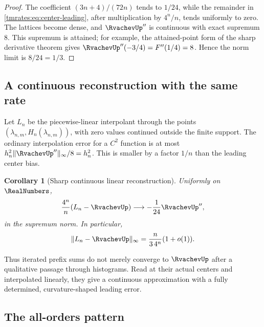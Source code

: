 \documentclass[11pt,oneside]{article}
\newtheorem{corollary}[corollary]{Corollary}
\theoremstyle{definition}
\theoremstyle{remark}
\begin{document}
\begin{proof}
The coefficient $(3n+4)/(72n)$ tends to $1/24$, while the remainder in
\eqref{tmrates:eq:center-leading}, after multiplication by $4^n/n$, tends uniformly to zero.  The
lattices become dense, and $\RvachevUp''$ is continuous with exact supremum $8$.  This supremum
is attained; for example, the attained-point form of the sharp derivative theorem gives
$\RvachevUp''(-3/4)=F''(1/4)=8$.  Hence the norm limit is $8/24=1/3$.
\end{proof}

\subsection{A continuous reconstruction with the same rate}

Let $L_n$ be the piecewise-linear interpolant through the points
$(\lambda_{n,m},H_n(\lambda_{n,m}))$, with zero values continued outside the finite support.
The ordinary interpolation error for a $C^2$ function is at most
$h_n^2\|\RvachevUp''\|_\infty/8=h_n^2$.  This is smaller by a factor $1/n$ than the leading
center bias.

\begin{corollary}[Sharp continuous linear reconstruction]
\label{tmrates:cor:linear-rate}
Uniformly on $\RealNumbers$,
\begin{equation}
 \frac{4^n}{n}(L_n-\RvachevUp)\longrightarrow-\frac1{24}\RvachevUp'',   \label{tmrates:eq:linear-profile}
\end{equation}
in the supremum norm.  In particular,
\begin{equation}
 \|L_n-\RvachevUp\|_\infty=\frac n{3\,4^n}(1+o(1)).              \label{tmrates:eq:linear-sharp}
\end{equation}
\end{corollary}

Thus iterated prefix sums do not merely converge to $\RvachevUp$ after a qualitative passage through
histograms.  Read at their actual centers and interpolated linearly, they give a continuous
approximation with a fully determined, curvature-shaped leading error.

\subsection{The all-orders pattern}
\end{document}
